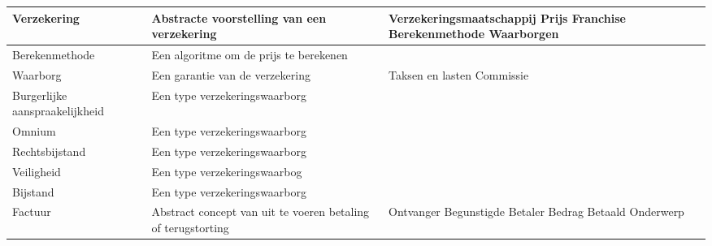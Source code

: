 \documentclass{article}
\begin{document}
\begin{tabularx}{\textwidth}{ | l | X |X|}
 Verzekering & 

 Abstracte voorstelling van een verzekering &
 
 Verzekeringsmaatschappij\newline
 Prijs\newline
 Franchise\newline
 Berekenmethode\newline
 Waarborgen\\
 \hline
 
 Berekenmethode & 

 Een algoritme om de prijs te berekenen &
 
 \\
 \hline
 
 Waarborg & 
 
 Een garantie van de verzekering  & 
 
 Taksen en lasten\newline
 Commissie\\
 
 \hline
 
 Burgerlijke aanspraakelijkheid & 

 Een type verzekeringswaarborg &
 
 \\
 
 \hline
 Omnium & 

 Een type verzekeringswaarborg &
 
 \\
 \hline
 Rechtsbijstand & 

 Een type verzekeringswaarborg &
 
 \\
 \hline
 
 Veiligheid & 
 
 Een type verzekeringswaarbog &
 
 \\
 \hline
 
 Bijstand & 
 
 Een type verzekeringswaarborg & 
 
 \\
 \hline
 
 Factuur & 

 Abstract concept van uit te voeren betaling of terugstorting &
 
 Ontvanger\newline
 Begunstigde\newline
 Betaler\newline
 Bedrag\newline
 Betaald\newline
 Onderwerp\\
 \hline
 

\end{tabularx}
\end{document}
